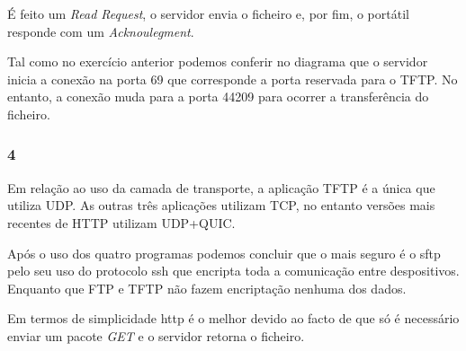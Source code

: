 \documentclass{article}
\begin{document}
                    É feito um \textit{Read Request}, o servidor envia o ficheiro e, por fim, o portátil responde com um \textit{Acknoulegment}.

                    Tal como no exercício anterior podemos conferir no diagrama que o servidor inicia a conexão na porta 69 que corresponde a porta reservada para o TFTP. No entanto, a conexão muda para a porta 44209 para ocorrer a transferência do ficheiro.
            \clearpage
            \subsubsection*{4}
		            Em relação ao uso da camada de transporte, a aplicação TFTP é a única que utiliza UDP. As outras três aplicações utilizam TCP, no entanto versões mais recentes de HTTP utilizam UDP+QUIC.

                    Após o uso dos quatro programas podemos concluir que o mais seguro é o sftp pelo seu uso do protocolo ssh que encripta toda a comunicação entre despositivos. Enquanto que FTP e TFTP não fazem encriptação nenhuma dos dados.

                    Em termos de simplicidade http é o melhor devido ao facto de que só é necessário enviar um pacote \textit{GET} e o servidor retorna o ficheiro.
\end{document}
